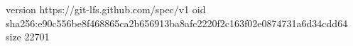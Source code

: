 version https://git-lfs.github.com/spec/v1
oid sha256:e90c556be8f468865ca2b656913ba8afc2220f2c163f02e0874731a6d34cdd64
size 22701
